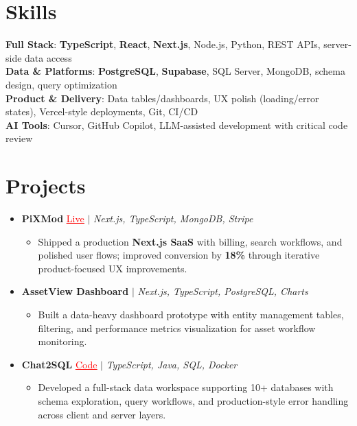 \documentclass[letterpaper,10pt]{article}
\newcommand{\resumeItem}[1]{\item\small{{#1 \vspace{-2pt}}}}
\newcommand{\resumeProjectHeading}[1]{\item \small #1 \vspace{-2pt}}
\newcommand{\resumeSubHeadingListStart}{\begin{itemize}[leftmargin=0.0in, label={}]}
\newcommand{\resumeSubHeadingListEnd}{\end{itemize}}
\newcommand{\resumeProjItemListStart}{\begin{itemize}[leftmargin=0.15in,label=\textbullet,itemsep=0pt,topsep=0pt,parsep=0pt,partopsep=0pt]}
\newcommand{\resumeProjItemListEnd}{\end{itemize}\vspace{-4pt}}
\begin{document}
\section{Skills}
\begin{itemize}[leftmargin=0.15in, label={}]
\small{\item{
\textbf{Full Stack}: \textbf{TypeScript}, \textbf{React}, \textbf{Next.js}, Node.js, Python, REST APIs, server-side data access \\
\textbf{Data \& Platforms}: \textbf{PostgreSQL}, \textbf{Supabase}, SQL Server, MongoDB, schema design, query optimization \\
\textbf{Product \& Delivery}: Data tables/dashboards, UX polish (loading/error states), Vercel-style deployments, Git, CI/CD \\
\textbf{AI Tools}: Cursor, GitHub Copilot, LLM-assisted development with critical code review
}}
\end{itemize}
\vspace{-16pt}
\section{Projects}
\resumeSubHeadingListStart
\vspace{-2pt}
\resumeProjectHeading{\textbf{PiXMod} {\href{https://pixmod.vercel.app/}{\textcolor{red}{\underline{Live}}}} $|$ \emph{Next.js, TypeScript, MongoDB, Stripe}}
\resumeProjItemListStart
\resumeItem{Shipped a production \textbf{Next.js SaaS} with billing, search workflows, and polished user flows; improved conversion by \textbf{18\%} through iterative product-focused UX improvements.}
\resumeProjItemListEnd
\vspace{3pt}
\resumeProjectHeading{\textbf{AssetView Dashboard} $|$ \emph{Next.js, TypeScript, PostgreSQL, Charts}}
\resumeProjItemListStart
\resumeItem{Built a data-heavy dashboard prototype with entity management tables, filtering, and performance metrics visualization for asset workflow monitoring.}
\resumeProjItemListEnd
\vspace{3pt}
\resumeProjectHeading{\textbf{Chat2SQL} {\href{https://github.com/SAHAJ-BHADJA/Chat2SQL}{\textcolor{red}{\underline{Code}}}} $|$ \emph{TypeScript, Java, SQL, Docker}}
\resumeProjItemListStart
\resumeItem{Developed a full-stack data workspace supporting 10+ databases with schema exploration, query workflows, and production-style error handling across client and server layers.}
\resumeProjItemListEnd
\resumeSubHeadingListEnd
\end{document}

